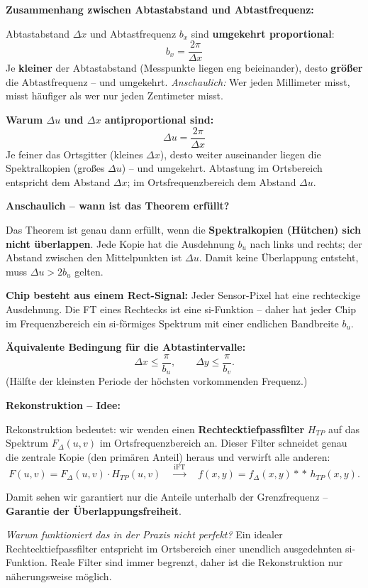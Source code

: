 \documentclass[12pt, a4paper]{article}
\begin{document}
\textbf{Zusammenhang zwischen Abtastabstand und Abtastfrequenz:}

Abtastabstand $\Delta x$ und Abtastfrequenz $b_x$ sind \textbf{umgekehrt proportional}:
\[
  b_x = \frac{2\pi}{\Delta x}
\]
Je \textbf{kleiner} der Abtastabstand (Messpunkte liegen eng beieinander), desto \textbf{größer} die Abtastfrequenz -- und umgekehrt. \textit{Anschaulich:} Wer jeden Millimeter misst, misst häufiger als wer nur jeden Zentimeter misst.

\textbf{Warum $\Delta u$ und $\Delta x$ antiproportional sind:}
\[
  \Delta u = \frac{2\pi}{\Delta x}
\]
Je feiner das Ortsgitter (kleines $\Delta x$), desto weiter auseinander liegen die Spektralkopien (großes $\Delta u$) -- und umgekehrt. Abtastung im Ortsbereich entspricht dem Abstand $\Delta x$; im Ortsfrequenzbereich dem Abstand $\Delta u$.

\textbf{Anschaulich -- wann ist das Theorem erfüllt?}

Das Theorem ist genau dann erfüllt, wenn die \textbf{Spektralkopien (Hütchen) sich nicht überlappen}. Jede Kopie hat die Ausdehnung $b_u$ nach links und rechts; der Abstand zwischen den Mittelpunkten ist $\Delta u$. Damit keine Überlappung entsteht, muss $\Delta u > 2b_u$ gelten.

\textbf{Chip besteht aus einem Rect-Signal:} Jeder Sensor-Pixel hat eine rechteckige Ausdehnung. Die FT eines Rechtecks ist eine si-Funktion -- daher hat jeder Chip im Frequenzbereich ein si-förmiges Spektrum mit einer endlichen Bandbreite $b_u$.

\textbf{Äquivalente Bedingung für die Abtastintervalle:}
\[
  \Delta x \leq \frac{\pi}{b_u}, \qquad \Delta y \leq \frac{\pi}{b_v}.
\]
(Hälfte der kleinsten Periode der höchsten vorkommenden Frequenz.)

\textbf{Rekonstruktion -- Idee:}

Rekonstruktion bedeutet: wir wenden einen \textbf{Rechtecktiefpassfilter} $H_{TP}$ auf das Spektrum $F_\Delta(u,v)$ im Ortsfrequenzbereich an. Dieser Filter schneidet genau die zentrale Kopie (den \glqq{}primären Anteil\grqq{}) heraus und verwirft alle anderen:
\[
  F(u,v) = F_\Delta(u,v)\cdot H_{TP}(u,v)
  \quad\xrightarrow{\text{iFT}}\quad
  f(x,y) = f_\Delta(x,y)\ast\!\ast\,h_{TP}(x,y).
\]

Damit sehen wir garantiert nur die Anteile unterhalb der Grenzfrequenz -- \textbf{Garantie der Überlappungsfreiheit}.

\textit{Warum funktioniert das in der Praxis nicht perfekt?} Ein idealer Rechtecktiefpassfilter entspricht im Ortsbereich einer unendlich ausgedehnten si-Funktion. Reale Filter sind immer begrenzt, daher ist die Rekonstruktion nur näherungsweise möglich.
\end{document}
